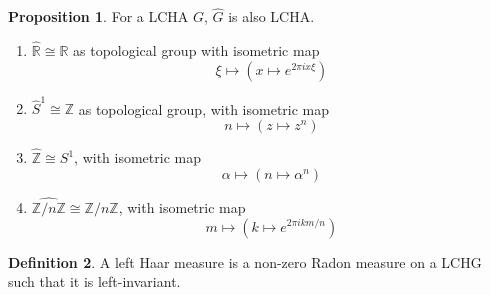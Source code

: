 \documentclass[12pt,a4paper]{book}
\newenvironment{enu}{\begin{enumerate}[(1)]}{\end{enumerate}}
\theoremstyle{definition}
\newtheorem{defn}{Definition}[section]
\newtheorem{prop}[defn]{Proposition}
\begin{document}
\begin{prop}
    For a LCHA $G$, $\hat{G}$ is also LCHA. 
    \begin{enu}
        \item $\hat{\mathbb{R}} \cong \mathbb{R}$ as topological group with isometric map
        \begin{equation*}
            \xi \mapsto (x\mapsto e^{2\pi ix\xi })
        \end{equation*}
        \item $\hat{S}^1 \cong \mathbb{Z}$ as topological group, with isometric map
        \begin{equation*}
            n\mapsto (z\mapsto z^n)
        \end{equation*}
        \item $\hat{\mathbb{Z}} \cong S^1$, with isometric map
        \begin{equation*}
            \alpha\mapsto (n\mapsto \alpha^n)
        \end{equation*}
        \item $\widehat{\mathbb{Z} / n \mathbb{Z}} \cong \mathbb{Z} / n \mathbb{Z}$, with isometric map
        \begin{equation*}
            m\mapsto (k\mapsto e^{2\pi ikm/n})
        \end{equation*}
    \end{enu}
\end{prop}
\begin{defn}
    A left Haar measure is a non-zero Radon measure on a LCHG such that it is left-invariant.
\end{defn}
\end{document}
